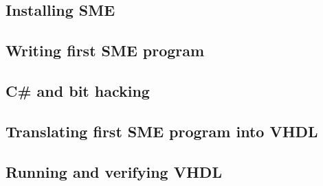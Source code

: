 \subsection{Installing SME}
\subsection{Writing first SME program}
\subsection{C\# and bit hacking}
\subsection{Translating first SME program into VHDL}
\subsection{Running and verifying VHDL}
